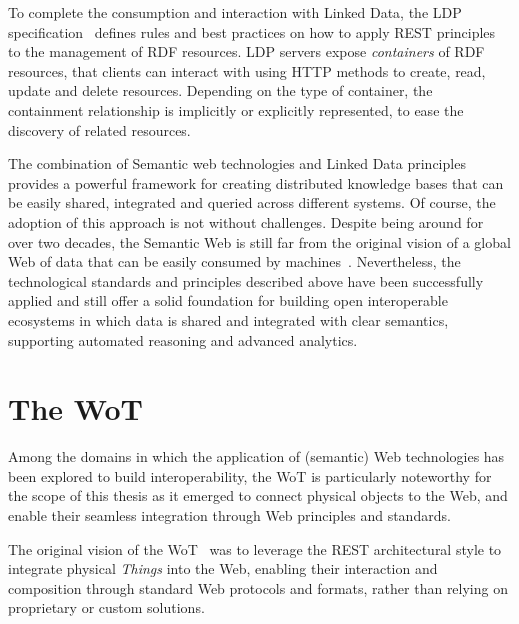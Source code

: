 To complete the consumption and interaction with Linked Data, the \ac{LDP} specification~\cite{ldp} defines rules and best practices on how to apply \ac{REST} principles to the management of \ac{RDF} resources.
%
\ac{LDP} servers expose \emph{containers} of \ac{RDF} resources, that clients can interact with using \ac{HTTP} methods to create, read, update and delete resources. Depending on the type of container, the containment relationship is implicitly or explicitly represented, to ease the discovery of related resources.

The combination of Semantic web technologies and Linked Data principles provides a powerful framework for creating distributed knowledge bases that can be easily shared, integrated and queried across different systems.
%
Of course, the adoption of this approach is not without challenges. 
%
Despite being around for over two decades, the Semantic Web is still far from the original vision of a global Web of data that can be easily consumed by machines~\cite{Hogan_2020}. 
%
Nevertheless, the technological standards and principles described above have been successfully applied and still offer a solid foundation for building open interoperable ecosystems in which data is shared and integrated with clear semantics, supporting automated reasoning and advanced analytics.


\section{The \acl{WoT}}
\label{chap:back:web:WoT}

Among the domains in which the application of (semantic) Web technologies has been explored to build interoperability, the \ac{WoT} is particularly noteworthy for the scope of this thesis as it emerged to connect physical objects to the Web, and enable their seamless integration through Web principles and standards.

The original vision of the \ac{WoT}~\cite{Wilde_2007,dguinard:wotMashups:2009} was to leverage the \ac{REST} architectural style to integrate physical \emph{Things} into the Web, enabling their interaction and composition through standard Web protocols and formats, rather than relying on proprietary or custom solutions.

